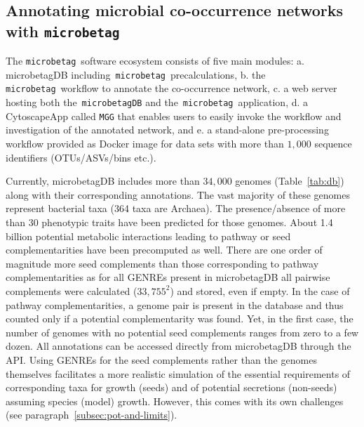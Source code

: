\documentclass[sn-mathphys,Numbered]{sn-jnl}  %
\theoremstyle{thmstyleone}%
\theoremstyle{thmstyletwo}%
\theoremstyle{thmstylethree}%
\newcommand{\microbetag}{\texttt{microbetag}}
\begin{document}
    \subsection*{Annotating microbial co-occurrence networks with \microbetag}
    \label{subsec:running-wf}

        The \microbetag~software ecosystem consists of five main modules:
        a. microbetagDB including~\microbetag~precalculations,
        b. the \microbetag~workflow to annotate the co-occurrence network,
        c. a web server hosting both the~\texttt{microbetagDB} and the~\microbetag~application,
        d. a CytoscapeApp called \texttt{MGG} that enables users to easily invoke the workflow and investigation of the annotated network, and
        e. a stand-alone pre-processing workflow provided as Docker image for data sets with more than $1,000$ sequence identifiers (OTUs/ASVs/bins etc.).

        Currently, microbetagDB includes more than $34,000$ genomes (Table~\ref{tab:db}) along with their corresponding annotations.
        The vast majority of these genomes represent bacterial taxa (364 taxa are Archaea).
        The presence/absence of more than 30 phenotypic traits have been predicted for those genomes.
        About 1.4 billion potential metabolic interactions leading to pathway or seed complementarities have been precomputed as well.
        There are one order of magnitude more seed complements than those corresponding to pathway complementarities as for all GENREs present in microbetagDB all pairwise complements were calculated ($33,755^2$) and stored, even if empty.
        In the case of pathway complementarities, a genome pair is present in the database and thus counted only if a potential complementarity was found.
        Yet, in the first case, the number of genomes with no potential seed complements ranges from zero to a few dozen.
        All annotations can be accessed directly from microbetagDB through the API.
        Using GENREs for the seed complements rather than the genomes themselves facilitates a more realistic simulation of the essential requirements of corresponding taxa for growth (seeds) and of potential secretions (non-seeds) assuming species (model) growth.
        However, this comes with its own challenges (see paragraph~\ref{subsec:pot-and-limits}). 
\end{document}
